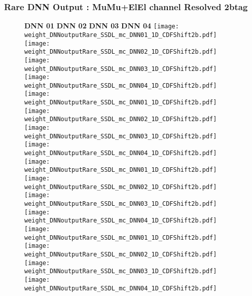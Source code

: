 \documentclass[9pt]{beamer}
\begin{document}
\begin{frame}
	\frametitle{Rare DNN Output : MuMu+ElEl channel Resolved 2btag}
	\begin{figure}
	    \textbf{DNN 01} \hspace{1.2cm} \textbf{DNN 02} \hspace{1.2cm} \textbf{DNN 03} \hspace{1.2cm} \textbf{DNN 04}
        \centering
		\texttt{[image: weight\_DNNoutputRare\_SSDL\_mc\_DNN01\_1D\_CDFShift2b.pdf]}
		\texttt{[image: weight\_DNNoutputRare\_SSDL\_mc\_DNN02\_1D\_CDFShift2b.pdf]}
		\texttt{[image: weight\_DNNoutputRare\_SSDL\_mc\_DNN03\_1D\_CDFShift2b.pdf]}
		\texttt{[image: weight\_DNNoutputRare\_SSDL\_mc\_DNN04\_1D\_CDFShift2b.pdf]}\\
		\texttt{[image: weight\_DNNoutputRare\_SSDL\_mc\_DNN01\_1D\_CDFShift2b.pdf]}
		\texttt{[image: weight\_DNNoutputRare\_SSDL\_mc\_DNN02\_1D\_CDFShift2b.pdf]}
		\texttt{[image: weight\_DNNoutputRare\_SSDL\_mc\_DNN03\_1D\_CDFShift2b.pdf]}
		\texttt{[image: weight\_DNNoutputRare\_SSDL\_mc\_DNN04\_1D\_CDFShift2b.pdf]}\\
		\texttt{[image: weight\_DNNoutputRare\_SSDL\_mc\_DNN01\_1D\_CDFShift2b.pdf]}
		\texttt{[image: weight\_DNNoutputRare\_SSDL\_mc\_DNN02\_1D\_CDFShift2b.pdf]}
		\texttt{[image: weight\_DNNoutputRare\_SSDL\_mc\_DNN03\_1D\_CDFShift2b.pdf]}
		\texttt{[image: weight\_DNNoutputRare\_SSDL\_mc\_DNN04\_1D\_CDFShift2b.pdf]}\\
		\texttt{[image: weight\_DNNoutputRare\_SSDL\_mc\_DNN01\_1D\_CDFShift2b.pdf]}
		\texttt{[image: weight\_DNNoutputRare\_SSDL\_mc\_DNN02\_1D\_CDFShift2b.pdf]}
		\texttt{[image: weight\_DNNoutputRare\_SSDL\_mc\_DNN03\_1D\_CDFShift2b.pdf]}
		\texttt{[image: weight\_DNNoutputRare\_SSDL\_mc\_DNN04\_1D\_CDFShift2b.pdf]}\\
	\end{figure}
\end{frame}
\end{document}
